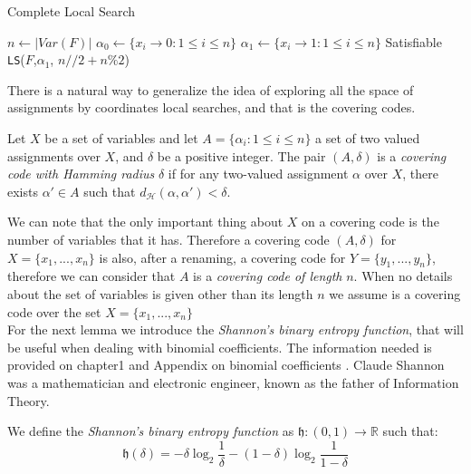 \begin{algorithm}
  \caption{Complete Local Search}\label{cls}
  \begin{algorithmic}[1]
    \State $n \gets |Var(F)|$
    \State $\alpha_0 \gets \{x_i \to 0 : 1 \le i \le n\}$
    \State $\alpha_1 \gets \{x_i \to 1 : 1 \le i \le n\}$
    \State
     \Return Satisfiable 
    \EndIf
    \State \Return \texttt{LS}($F$,$\alpha_1$, $n//2 + n\%2$)

\end{algorithmic}
\end{algorithm}



There is a natural way to generalize the idea of exploring all the space of assignments by coordinates local searches, and that is the covering codes.

\begin{definition}
  Let $X$ be a set of variables and let $A = \{\alpha_i: 1 \le i \le n\}$ a set of two valued assignments over $X$, and $\delta$ be a positive integer. The pair $(A,\delta)$ is a \emph{covering code with Hamming radius} $\delta$ if for any  two-valued assignment  $\alpha$  over $X$, there exists $\alpha'\in A$ such that $d_\mathcal{H} (\alpha, \alpha') < \delta$.
\end{definition}


We can note that the only important thing about $X$ on a covering code is the number of variables that it has. Therefore a covering code $(A,\delta)$ for $X=\{x_1,...,x_n\}$ is also, after a renaming, a covering code for $Y=\{y_1,...,y_n\}$, therefore we can consider that $A$ is a \emph{covering code of length} $n$. When no details about the set of variables is given other than its length $n$ we assume is a covering code over the set $X = \{x_1,...,x_n\}$\\


For the next lemma we introduce the \emph{Shannon's binary entropy function}, that will be useful when dealing with binomial coefficients. The information needed is provided on chapter1 \cite{mackay2003information} and Appendix on binomial coefficients \cite{schoning2013satisfiability}. Claude Shannon was a mathematician and electronic engineer, known as the father of Information Theory. 

\begin{definition}
  We define the \emph{Shannon's binary entropy function} as $\mathfrak{h}:(0,1)\to \mathbb{R}$ such that:
  $$ \mathfrak{h}(\delta) = -  \delta \log_2 \frac{1}{\delta}  - (1-\delta)\log_2 \frac{1}{1-\delta}$$
\end{definition}


